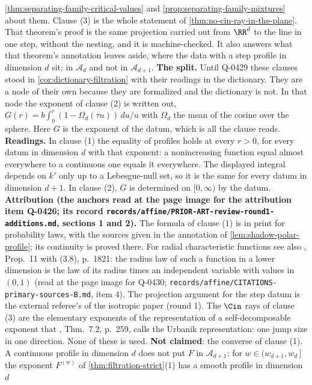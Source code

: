 \begin{proposition}
{\ref{thm:separating-family-critical-values} and
\ref{prop:separating-family-mixtures} about them. Clause (3) is the whole statement of
\ref{thm:no-cin-ray-in-the-plane}. That theorem's proof is the same projection carried out from
$\RR^d$ to the line in one step, without the nesting, and it is machine-checked. It also answers
what that theorem's annotation leaves aside, where the data with a step profile in dimension
$d$ sit: in $\mathcal{A}_d$ and not in $\mathcal{A}_{d+1}$. \textbf{The split.} Until Q-0429
these clauses stood in \ref{cor:dictionary-filtration} with their readings in the dictionary.
They are a node of their own because they are formalized and the dictionary is not. In
that node the exponent of clause (2) is written out,
$G(r) = b\int_0^r(1 - \Omega_d(\tau u))\,du/u$ with $\Omega_d$ the mean of the cosine over the
sphere. Here $G$ is the exponent of the datum, which is all the clause reads. \textbf{Readings.}
In clause (1) the equality of profiles holds at every $r > 0$, for every datum in dimension $d$
with that exponent: a nonincreasing function equal almost everywhere to a continuous one equals
it everywhere. The displayed integral depends on $k'$ only up to a Lebesgue-null set, so it is
the same for every datum in dimension $d + 1$. In clause (2), $G$ is determined on $[0,\infty)$
by the datum. \textbf{Attribution (the anchors read
at the page image for the attribution item Q-0426; its record
\texttt{records/affine/PRIOR-ART-review-round1-additions.md}, sections 1 and 2).} The
formula of clause (1) is in print for probability laws, with the sources given in the annotation
of \ref{lem:shadow-polar-profile}; its continuity is proved there. For radial characteristic
functions see also , Prop.~11 with (3.8), p.~1821: the radius law of
such a function in a lower dimension is the law of its radius times an independent variable
with values in $(0,1)$ (read at the page image for Q-0430;
\texttt{records/affine/CITATIONS-primary-sources-B.md}, item 4). The projection argument for
the step datum is the external referee's of the isotropic paper (round 1). The $\Cin$ rays of
clause (3) are the elementary exponents of
the representation of a self-decomposable exponent that , Thm.~7.2,
p.~259, calls the Urbanik representation: one jump size in one direction. None of these is used.
\textbf{Not claimed}: the converse of clause (1). A continuous profile in dimension $d$ does not
put $F$ in $\mathcal{A}_{d+1}$: for $w \in (w_{d+1}, w_d\,]$ the exponent $F^{(w)}$ of
\ref{thm:filtration-strict}(1) has a smooth profile in dimension $d$
}
\end{proposition}
